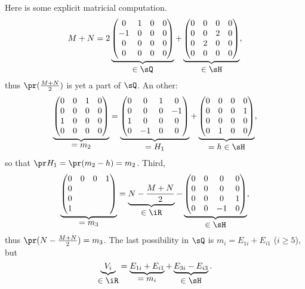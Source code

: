 Here is some explicit matricial computation.
\[
	M+N=2
	\underbrace{
		\begin{pmatrix}
			0  & 1 & 0 & 0 \\
			-1 & 0 & 0 & 0 \\
			0  & 0 & 0 & 0 \\
			0  & 0 & 0 & 0
		\end{pmatrix}}_{\displaystyle\in\sQ}
	+
	\underbrace{
		\begin{pmatrix}
			0 & 0 & 0 & 0 \\
			0 & 0 & 2 & 0 \\
			0 & 2 & 0 & 0 \\
			0 & 0 & 0 & 0
		\end{pmatrix}}_{\displaystyle\in\sH},
\]
thus $\pr(\frac{M+N}{2})$ is yet a part of $\sQ$. An other:
\[
	\underbrace{
		\begin{pmatrix}
			0 & 0 & 1 & 0 \\
			0 & 0 & 0 & 0 \\
			1 & 0 & 0 & 0 \\
			0 & 0 & 0 & 0
		\end{pmatrix}}_{\displaystyle =m_2}
	= \underbrace{
		\begin{pmatrix}
			0 & 0  & 1 & 0  \\
			0 & 0  & 0 & -1 \\
			1 & 0  & 0 & 0  \\
			0 & -1 & 0 & 0
		\end{pmatrix}}_{\displaystyle =H_1}
	+
	\underbrace{
		\begin{pmatrix}
			0 & 0 & 0 & 0 \\
			0 & 0 & 0 & 1 \\
			0 & 0 & 0 & 0 \\
			0 & 1 & 0 & 0
		\end{pmatrix}}_{\displaystyle =h\in\sH},
\]
so that $\pr H_1=\pr(m_2-h)=m_2$. Third,
\[
	\underbrace{
		\begin{pmatrix}
			0 & 0 & 0 & 1 \\
			0             \\
			0             \\
			1
		\end{pmatrix}}_{\displaystyle=m_3}
	=
	\underbrace{N-\frac{M+N}{2}}_{\displaystyle\in\iR}
	-
	\underbrace{%
		\begin{pmatrix}
			0 & 0 & 0  & 0 \\
			0 & 0 & 0  & 0 \\
			0 & 0 & 0  & 1 \\
			0 & 0 & -1 & 0 \\
		\end{pmatrix}}_{\displaystyle\in\sH},
\]
thus $\pr(N-\frac{M+N}{2})=m_3$. The last possibility in $\sQ$ is $m_i=E_{1i}+E_{i1}$ ($i\geq 5$), but
\[
	\underbrace{V_i}_{\displaystyle\in\iR}
	=\underbrace{E_{1i}+E_{i1}}_{\displaystyle =m_i}+\underbrace{E_{3i}-E_{i3}}_{\displaystyle\in\sH}.
\]


